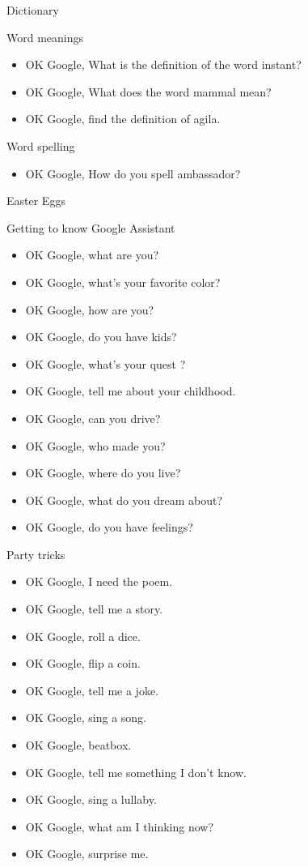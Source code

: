 \documentclass[
  letterpaper,
  DIV=11,
  numbers=noendperiod]{scrartcl}
\providecommand{\tightlist}{%
  \setlength{\itemsep}{0pt}\setlength{\parskip}{0pt}}\usepackage{longtable,booktabs,array}
\begin{document}
Dictionary

Word meanings

\begin{itemize}
\tightlist
\item
  OK Google, What is the definition of the word instant?
\item
  OK Google, What does the word mammal mean?
\item
  OK Google, find the definition of agila.
\end{itemize}

Word spelling

\begin{itemize}
\tightlist
\item
  OK Google, How do you spell ambassador?
\end{itemize}

Easter Eggs

Getting to know Google Assistant

\begin{itemize}
\item
  OK Google, what are you?
\item
  OK Google, what's your favorite color?
\item
  OK Google, how are you?
\item
  OK Google, do you have kids?
\item
  OK Google, what's your quest ?
\item
  OK Google, tell me about your childhood.
\item
  OK Google, can you drive?
\item
  OK Google, who made you?
\item
  OK Google, where do you live?
\item
  OK Google, what do you dream about?
\item
  OK Google, do you have feelings?
\end{itemize}

Party tricks

\begin{itemize}
\item
  OK Google, I need the poem.
\item
  OK Google, tell me a story.
\item
  OK Google, roll a dice.
\item
  OK Google, flip a coin.
\item
  OK Google, tell me a joke.
\item
  OK Google, sing a song.
\item
  OK Google, beatbox.
\item
  OK Google, tell me something I don't know.
\item
  OK Google, sing a lullaby.
\item
  OK Google, what am I thinking now?
\item
  OK Google, surprise me.
\end{itemize}
\end{document}

